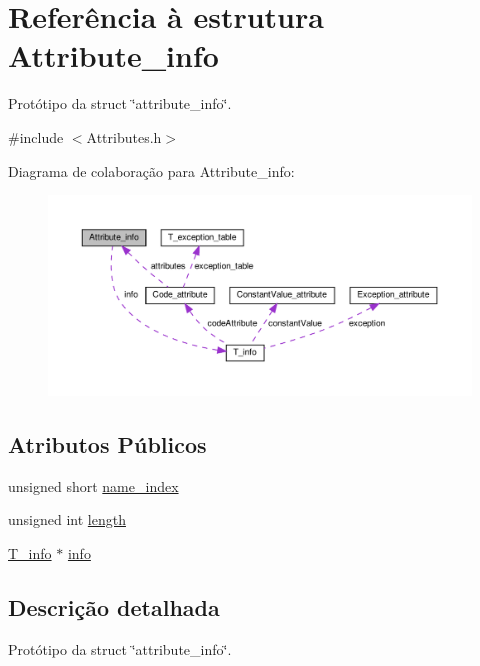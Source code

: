 \hypertarget{structAttribute__info}{}\section{Referência à estrutura Attribute\+\_\+info}
\label{structAttribute__info}


Protótipo da struct \char`\"{}attribute\+\_\+info\char`\"{}.  




{\ttfamily \#include $<$Attributes.\+h$>$}



Diagrama de colaboração para Attribute\+\_\+info\+:
\nopagebreak
\begin{figure}[H]
\begin{center}
\leavevmode
\includegraphics[width=350pt]{structAttribute__info__coll__graph}
\end{center}
\end{figure}
\subsection*{Atributos Públicos}
\begin{DoxyCompactItemize}
\item 
unsigned short \hyperlink{structAttribute__info_aa20aae72733ad98febeea64ad7927526}{name\+\_\+index}
\item 
unsigned int \hyperlink{structAttribute__info_aa76577f95471a7093757bb127f24702f}{length}
\item 
\hyperlink{unionT__info}{T\+\_\+info} $\ast$ \hyperlink{structAttribute__info_a8612e1228cbf9673986c9fee603dceca}{info}
\end{DoxyCompactItemize}


\subsection{Descrição detalhada}
Protótipo da struct \char`\"{}attribute\+\_\+info\char`\"{}. 

